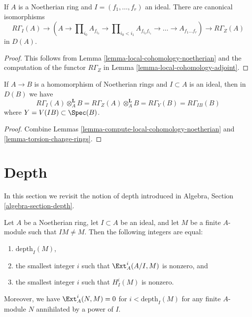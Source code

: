 \begin{lemma}
\label{lemma-compute-local-cohomology-noetherian}
If $A$ is a Noetherian ring and $I = (f_1, \ldots, f_r)$ an ideal.
There are canonical isomorphisms
$$
R\Gamma_I(A) \to
(A \to \prod\nolimits_{i_0} A_{f_{i_0}} \to
\prod\nolimits_{i_0 < i_1} A_{f_{i_0}f_{i_1}} \to
\ldots \to A_{f_1\ldots f_r}) \to R\Gamma_Z(A)
$$
in $D(A)$.
\end{lemma}

\begin{proof}
This follows from Lemma \ref{lemma-local-cohomology-noetherian}
and the computation of the functor $R\Gamma_Z$ in
Lemma \ref{lemma-local-cohomology-adjoint}.
\end{proof}

\begin{lemma}
\label{lemma-local-cohomology-change-rings}
If $A \to B$ is a homomorphism of Noetherian rings and $I \subset A$
is an ideal, then in $D(B)$ we have
$$
R\Gamma_I(A) \otimes_A^\mathbf{L} B =
R\Gamma_Z(A) \otimes_A^\mathbf{L} B =
R\Gamma_Y(B) = R\Gamma_{IB}(B)
$$
where $Y = V(IB) \subset \Spec(B)$.
\end{lemma}

\begin{proof}
Combine Lemmas \ref{lemma-compute-local-cohomology-noetherian} and
\ref{lemma-torsion-change-rings}.
\end{proof}






\section{Depth}
\label{section-depth}

\noindent
In this section we revisit the notion of depth introduced in
Algebra, Section \ref{algebra-section-depth}.

\begin{lemma}
\label{lemma-depth}
Let $A$ be a Noetherian ring, let $I \subset A$ be an ideal, and
let $M$ be a finite $A$-module such that $IM \not = M$. Then
the following integers are equal:
\begin{enumerate}
\item $\text{depth}_I(M)$,
\item the smallest integer $i$ such that $\Ext_A^i(A/I, M)$
is nonzero, and
\item the smallest integer $i$ such that $H^i_I(M)$ is nonzero.
\end{enumerate}
Moreover, we have $\Ext^i_A(N, M) = 0$ for $i < \text{depth}_I(M)$
for any finite $A$-module $N$ annihilated by a power of $I$.
\end{lemma}

